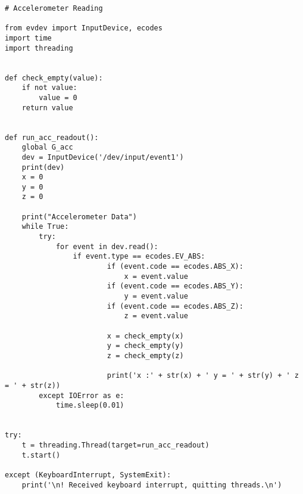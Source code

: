 \begin{verbatim}
# Accelerometer Reading

from evdev import InputDevice, ecodes
import time
import threading


def check_empty(value):
    if not value:
        value = 0
    return value


def run_acc_readout():
    global G_acc
    dev = InputDevice('/dev/input/event1')
    print(dev)
    x = 0
    y = 0
    z = 0

    print("Accelerometer Data")
    while True:
        try:
            for event in dev.read():
                if event.type == ecodes.EV_ABS:
                        if (event.code == ecodes.ABS_X):
                            x = event.value
                        if (event.code == ecodes.ABS_Y):
                            y = event.value
                        if (event.code == ecodes.ABS_Z):
                            z = event.value

                        x = check_empty(x)
                        y = check_empty(y)
                        z = check_empty(z)

                        print('x :' + str(x) + ' y = ' + str(y) + ' z = ' + str(z))
        except IOError as e:
            time.sleep(0.01)


try:
    t = threading.Thread(target=run_acc_readout)
    t.start()

except (KeyboardInterrupt, SystemExit):
    print('\n! Received keyboard interrupt, quitting threads.\n')


\end{verbatim}